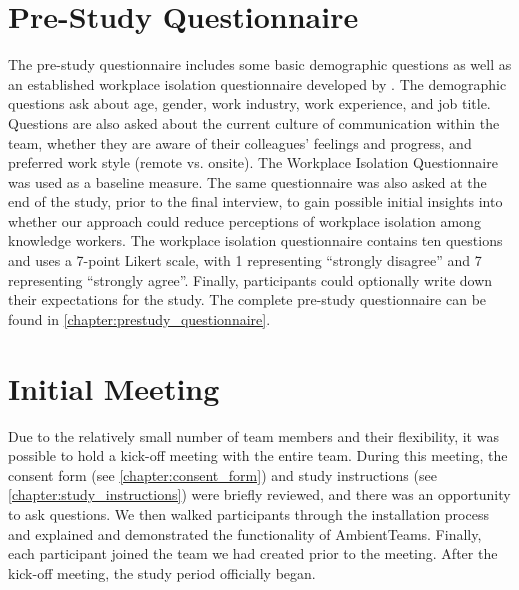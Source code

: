 \section{Pre-Study Questionnaire}
\label{section:prestudy_questionnaire}
The pre-study questionnaire includes some basic demographic questions as well as an established workplace isolation questionnaire developed by \textcite{marshall2007workplace}. The demographic questions ask about age, gender, work industry, work experience, and job title. Questions are also asked about the current culture of communication within the team, whether they are aware of their colleagues' feelings and progress, and preferred work style (remote vs. onsite). The Workplace Isolation Questionnaire was used as a baseline measure. The same questionnaire was also asked at the end of the study, prior to the final interview, to gain possible initial insights into whether our approach could reduce perceptions of workplace isolation among knowledge workers. The workplace isolation questionnaire contains ten questions and uses a 7-point Likert scale, with 1 representing \enquote{strongly disagree} and 7 representing \enquote{strongly agree}. Finally, participants could optionally write down their expectations for the study. The complete pre-study questionnaire can be found in \autoref{chapter:prestudy_questionnaire}.

\section{Initial Meeting}
\label{section:initial_meeting}
Due to the relatively small number of team members and their flexibility, it was possible to hold a kick-off meeting with the entire team. During this meeting, the consent form (see \autoref{chapter:consent_form}) and study instructions (see \autoref{chapter:study_instructions}) were briefly reviewed, and there was an opportunity to ask questions. We then walked participants through the installation process and explained and demonstrated the functionality of AmbientTeams. Finally, each participant joined the team we had created prior to the meeting. After the kick-off meeting, the study period officially began.

